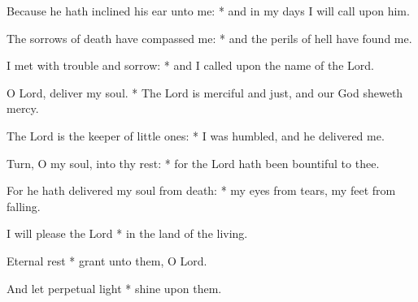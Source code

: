 \item Because he hath inclined his ear unto me: * and in my days I will call upon him.
\item The sorrows of death have compassed me: * and the perils of hell have found me.
\item I met with trouble and sorrow: * and I called upon the name of the Lord.
\item O Lord, deliver my soul. * The Lord is merciful and just, and our God sheweth mercy.
\item The Lord is the keeper of little ones: * I was humbled, and he delivered me.
\item Turn, O my soul, into thy rest: * for the Lord hath been bountiful to thee.
\item For he hath delivered my soul from death: * my eyes from tears, my feet from falling.
\item I will please the Lord * in the land of the living.
\item Eternal rest * grant unto them, O Lord.
\item And let perpetual light * shine upon them.
